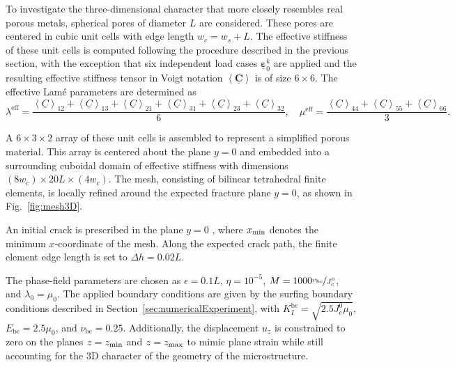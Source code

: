 \documentclass[pdflatex,sn-mathphys-num]{sn-jnl}%
\theoremstyle{thmstyleone}%
\theoremstyle{thmstyletwo}%
\theoremstyle{thmstylethree}%
\begin{document}
To investigate the three-dimensional character that more closely resembles real porous metals, spherical pores of diameter $L$ are considered. These pores are centered in cubic unit cells with edge length $w_c = w_s + L$. The effective stiffness of these unit cells is computed following the procedure described in the previous section, with the exception that six independent load cases $\underline{\boldsymbol{\varepsilon}}_0^k$ are applied and the resulting effective stiffness tensor in Voigt notation 
$\left< \underline{\boldsymbol{C}} \right>$ is of size $6\times6$. The effective Lam\'e parameters are determined as
\begin{equation}
    \lambda^{\text{eff}} = \dfrac{\left< \underline{C} \right>_{12} + \left< \underline{C} \right>_{13} + \left< \underline{C} \right>_{21} + \left< \underline{C} \right>_{31} + \left< \underline{C} \right>_{23} + \left< \underline{C} \right>_{32}}{6}, \quad
    \mu^{\text{eff}} = \dfrac{\left< \underline{C} \right>_{44} + \left< \underline{C} \right>_{55} + \left< \underline{C} \right>_{66}}{3}.
\end{equation}

A $6\times3\times2$ array of these unit cells is assembled to represent a simplified porous material. This array is centered about the plane $y=0$ and embedded into a surrounding cuboidal domain of effective stiffness with dimensions $(8 w_c)\times 20L \times (4 w_c)$. The mesh, consisting of bilinear tetrahedral finite elements, is locally refined around the expected fracture plane $y=0$, as shown in Fig.~\ref{fig:mesh3D}.

An initial crack is prescribed in the plane $y=0$ , where $x_{\rm min}$ denotes the minimum $x$-coordinate of the mesh. Along the expected crack path, the finite element edge length is set to $\Delta h = 0.02L$.

The phase-field parameters are chosen as $\epsilon = 0.1L$, $\eta = 10^{-5}$, $M = 1000 \nicefrac{v_{\text{bc}}}{J_c^0}$, and $\lambda_0=\mu_0$. The applied boundary conditions are given by the surfing boundary conditions described in Section~\ref{sec:numericalExperiment}, with $K_I^{\text{bc}}=\sqrt{2.5J_c^0\mu_0}$, $E_{\text{bc}}=2.5\mu_0$, and $\nu_{\text{bc}}=0.25$. Additionally, the displacement $u_z$ is constrained to zero on the planes $z=z_{\rm min}$ and 
$z=z_{\rm max}$ to mimic plane strain while still accounting for the 3D character of the geometry of the microstructure.
\end{document}
